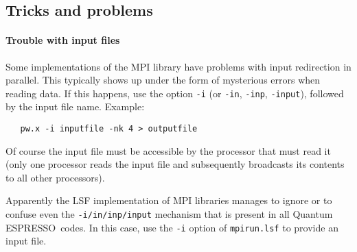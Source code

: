 \documentclass[12pt,a4paper]{article}
\def\qe{{\sc Quantum ESPRESSO}}
\begin{document}
\subsection{Tricks and problems}
\label{SubSec:badpara}

\paragraph{Trouble with input files}
Some implementations of the MPI library have problems with input 
redirection in parallel. This typically shows up under the form of
mysterious errors when reading data. If this happens, use the option 
\texttt{-i} (or \texttt{-in}, \texttt{-inp}, \texttt{-input}), 
followed by the input file name. 
Example:
\begin{verbatim}
   pw.x -i inputfile -nk 4 > outputfile
\end{verbatim} 
Of course the 
input file must be accessible by the processor that must read it
(only one processor reads the input file and subsequently broadcasts
its contents to all other processors).

Apparently the LSF implementation of MPI libraries manages to ignore or to
confuse even the \texttt{-i/in/inp/input} mechanism that is present in all
\qe\ codes. In this case, use the \texttt{-i} option of \texttt{mpirun.lsf}
to provide an input file.
\end{document}
